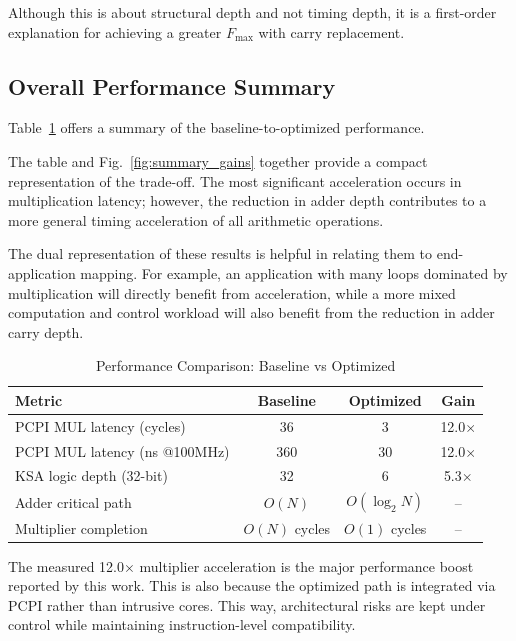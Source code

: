 Although this is about structural depth and not timing depth, it is a first-order explanation for achieving a greater $F_{\max}$ with carry replacement.



\subsection{Overall Performance Summary}
Table~\ref{tab:performance} offers a summary of the baseline-to-optimized performance.

The table and Fig.~\ref{fig:summary_gains} together provide a compact representation of the trade-off. The most significant acceleration occurs in multiplication latency; however, the reduction in adder depth contributes to a more general timing acceleration of all arithmetic operations.

The dual representation of these results is helpful in relating them to end-application mapping. For example, an application with many loops dominated by multiplication will directly benefit from acceleration, while a more mixed computation and control workload will also benefit from the reduction in adder carry depth.

\begin{table}[htbp]
\caption{Performance Comparison: Baseline vs Optimized}
\label{tab:performance}
\centering
\begin{tabular}{@{}lccc@{}}
\toprule
\textbf{Metric} & \textbf{Baseline} & \textbf{Optimized} & \textbf{Gain} \\
\midrule
PCPI MUL latency (cycles) & 36 & 3 & 12.0$\times$ \\
PCPI MUL latency (ns @100MHz) & 360 & 30 & 12.0$\times$ \\
KSA logic depth (32-bit) & 32 & 6 & 5.3$\times$ \\
Adder critical path & $O(N)$ & $O(\log_2 N)$ & -- \\
Multiplier completion & $O(N)$ cycles & $O(1)$ cycles & -- \\
\bottomrule
\end{tabular}
\end{table}

The measured 12.0$\times$ multiplier acceleration is the major performance boost reported by this work. This is also because the optimized path is integrated via PCPI rather than intrusive cores. This way, architectural risks are kept under control while maintaining instruction-level compatibility.

